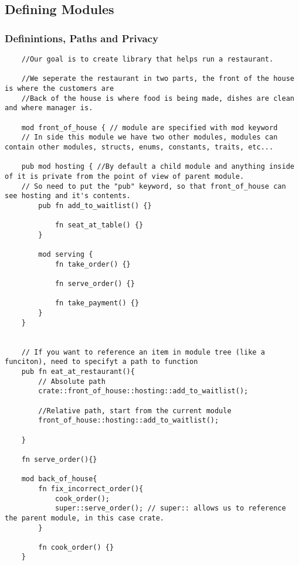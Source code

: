 \subsection{Defining Modules}
\newpage
\subsubsection{Definintions, Paths and Privacy}
\begin{lstlisting}
    //Our goal is to create library that helps run a restaurant.

    //We seperate the restaurant in two parts, the front of the house is where the customers are
    //Back of the house is where food is being made, dishes are clean and where manager is.

    mod front_of_house { // module are specified with mod keyword
    // In side this module we have two other modules, modules can contain other modules, structs, enums, constants, traits, etc...
    
    pub mod hosting { //By default a child module and anything inside of it is private from the point of view of parent module.  
    // So need to put the "pub" keyword, so that front_of_house can see hosting and it's contents.
        pub fn add_to_waitlist() {}

            fn seat_at_table() {}
        }

        mod serving {
            fn take_order() {}

            fn serve_order() {}

            fn take_payment() {}
        }
    }


    // If you want to reference an item in module tree (like a funciton), need to specifyt a path to function
    pub fn eat_at_restaurant(){
        // Absolute path
        crate::front_of_house::hosting::add_to_waitlist();

        //Relative path, start from the current module
        front_of_house::hosting::add_to_waitlist();

    }

    fn serve_order(){}

    mod back_of_house{
        fn fix_incorrect_order(){
            cook_order();
            super::serve_order(); // super:: allows us to reference the parent module, in this case crate.
        }

        fn cook_order() {}
    }
\end{lstlisting}
\newpage 


